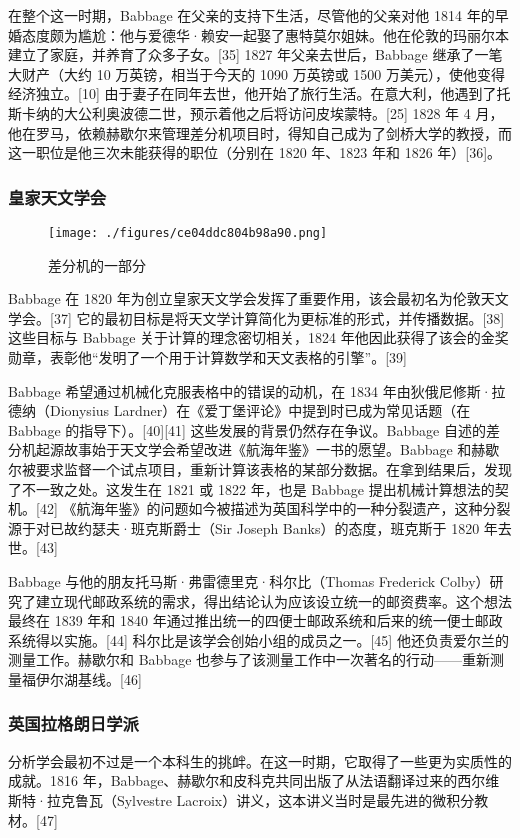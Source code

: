 在整个这一时期，Babbage 在父亲的支持下生活，尽管他的父亲对他 1814 年的早婚态度颇为尴尬：他与爱德华·赖安一起娶了惠特莫尔姐妹。他在伦敦的玛丽尔本建立了家庭，并养育了众多子女。[35] 1827 年父亲去世后，Babbage 继承了一笔大财产（大约 10 万英镑，相当于今天的 1090 万英镑或 1500 万美元），使他变得经济独立。[10] 由于妻子在同年去世，他开始了旅行生活。在意大利，他遇到了托斯卡纳的大公利奥波德二世，预示着他之后将访问皮埃蒙特。[25] 1828 年 4 月，他在罗马，依赖赫歇尔来管理差分机项目时，得知自己成为了剑桥大学的教授，而这一职位是他三次未能获得的职位（分别在 1820 年、1823 年和 1826 年）[36]。
\subsubsection{皇家天文学会}  
\begin{figure}[ht]
\centering
\texttt{[image: ./figures/ce04ddc804b98a90.png]}
\caption{差分机的一部分} \label{fig_CRSBQ_7}
\end{figure}
Babbage 在 1820 年为创立皇家天文学会发挥了重要作用，该会最初名为伦敦天文学会。[37] 它的最初目标是将天文学计算简化为更标准的形式，并传播数据。[38] 这些目标与 Babbage 关于计算的理念密切相关，1824 年他因此获得了该会的金奖勋章，表彰他“发明了一个用于计算数学和天文表格的引擎”。[39]

Babbage 希望通过机械化克服表格中的错误的动机，在 1834 年由狄俄尼修斯·拉德纳（Dionysius Lardner）在《爱丁堡评论》中提到时已成为常见话题（在 Babbage 的指导下）。[40][41] 这些发展的背景仍然存在争议。Babbage 自述的差分机起源故事始于天文学会希望改进《航海年鉴》一书的愿望。Babbage 和赫歇尔被要求监督一个试点项目，重新计算该表格的某部分数据。在拿到结果后，发现了不一致之处。这发生在 1821 或 1822 年，也是 Babbage 提出机械计算想法的契机。[42] 《航海年鉴》的问题如今被描述为英国科学中的一种分裂遗产，这种分裂源于对已故约瑟夫·班克斯爵士（Sir Joseph Banks）的态度，班克斯于 1820 年去世。[43]

Babbage 与他的朋友托马斯·弗雷德里克·科尔比（Thomas Frederick Colby）研究了建立现代邮政系统的需求，得出结论认为应该设立统一的邮资费率。这个想法最终在 1839 年和 1840 年通过推出统一的四便士邮政系统和后来的统一便士邮政系统得以实施。[44] 科尔比是该学会创始小组的成员之一。[45] 他还负责爱尔兰的测量工作。赫歇尔和 Babbage 也参与了该测量工作中一次著名的行动——重新测量福伊尔湖基线。[46]
\subsubsection{英国拉格朗日学派}
分析学会最初不过是一个本科生的挑衅。在这一时期，它取得了一些更为实质性的成就。1816 年，Babbage、赫歇尔和皮科克共同出版了从法语翻译过来的西尔维斯特·拉克鲁瓦（Sylvestre Lacroix）讲义，这本讲义当时是最先进的微积分教材。[47]

